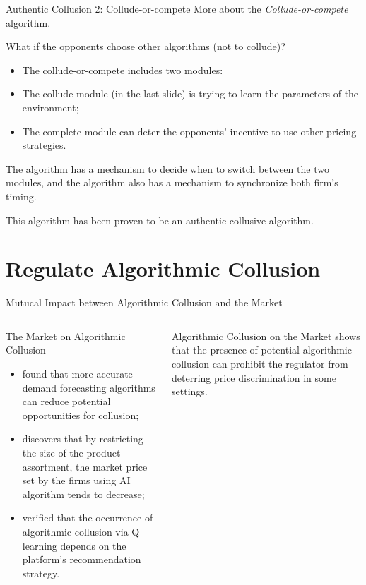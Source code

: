 \documentclass[8pt]{beamer}
\begin{document}
\begin{frame}{Authentic Collusion 2: Collude-or-compete}
    More about the \textit{Collude-or-compete} algorithm.

    \vspace{0.5cm}
    What if the opponents choose other algorithms (not to collude)?
    \begin{itemize}
        \item The collude-or-compete includes two modules:
            \item The collude module (in the last slide) is trying to learn the parameters of the environment;
            \item The complete module can deter the opponents' incentive to use other pricing strategies.
    \end{itemize}
    \vspace{0.5cm}
    The algorithm has a mechanism to decide when to switch between the two modules, and the algorithm also has a mechanism to synchronize both firm's timing.
    
    \vspace{1cm}
    This algorithm has been proven to be an authentic collusive algorithm.
\end{frame}

\section{Regulate Algorithmic Collusion}
\label{sec:reglate}

\begin{frame}{Mutucal Impact between Algorithmic Collusion and the Market}
    \begin{columns}[h]
        \begin{block}{The Market on Algorithmic Collusion}
            \begin{itemize}
                \item \cite{miklos2019collusion} found that more accurate demand forecasting algorithms can reduce potential opportunities for collusion;
                \item \cite{johnson2023platform} discovers that by restricting the size of the product assortment, the market price set by the firms using AI algorithm tends to decrease;
                \item \cite{xu2023algorithmic} verified that the occurrence of algorithmic collusion via Q-learning depends on the platform's recommendation strategy.
            \end{itemize}
        \end{block}
        \begin{block}{Algorithmic Collusion on the Market}
            \cite{yang2023regulating} shows that the presence of potential algorithmic collusion can prohibit the regulator from deterring price discrimination in some settings.
        \end{block}
    \end{columns}
\end{frame}
\end{document}
